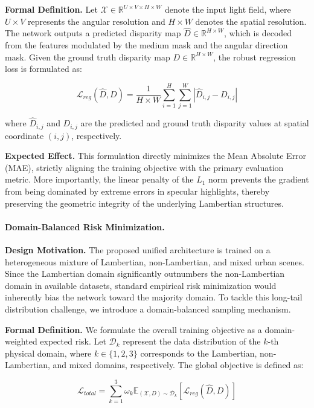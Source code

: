 \textbf{Formal Definition.} Let $\mathcal{X} \in \mathbb{R}^{U \times V \times H \times W}$ denote the input light field, where $U \times V$ represents the angular resolution and $H \times W$ denotes the spatial resolution. The network outputs a predicted disparity map $\hat{D} \in \mathbb{R}^{H \times W}$, which is decoded from the features modulated by the medium mask and the angular direction mask. Given the ground truth disparity map $D \in \mathbb{R}^{H \times W}$, the robust regression loss is formulated as:

\begin{equation}
\label{eq:eq27}
\mathcal{L}_{reg}(\hat{D}, D) = \frac{1}{H \times W} \sum_{i=1}^{H} \sum_{j=1}^{W} \left| \hat{D}_{i,j} - D_{i,j} \right|
\end{equation}

where $\hat{D}_{i,j}$ and $D_{i,j}$ are the predicted and ground truth disparity values at spatial coordinate $(i, j)$, respectively. 

\textbf{Expected Effect.} This formulation directly minimizes the Mean Absolute Error (MAE), strictly aligning the training objective with the primary evaluation metric. More importantly, the linear penalty of the $L_1$ norm prevents the gradient from being dominated by extreme errors in specular highlights, thereby preserving the geometric integrity of the underlying Lambertian structures.

\paragraph{Domain-Balanced Risk Minimization.}

\textbf{Design Motivation.} The proposed unified architecture is trained on a heterogeneous mixture of Lambertian, non-Lambertian, and mixed urban scenes. Since the Lambertian domain significantly outnumbers the non-Lambertian domain in available datasets, standard empirical risk minimization would inherently bias the network toward the majority domain. To tackle this long-tail distribution challenge, we introduce a domain-balanced sampling mechanism.

\textbf{Formal Definition.} We formulate the overall training objective as a domain-weighted expected risk. Let $\mathcal{D}_k$ represent the data distribution of the $k$-th physical domain, where $k \in \{1, 2, 3\}$ corresponds to the Lambertian, non-Lambertian, and mixed domains, respectively. The global objective is defined as:

\begin{equation}
\label{eq:eq28}
\mathcal{L}_{total} = \sum_{k=1}^{3} \omega_k \mathbb{E}_{(\mathcal{X}, D) \sim \mathcal{D}_k} \left[ \mathcal{L}_{reg}(\hat{D}, D) \right]
\end{equation}

